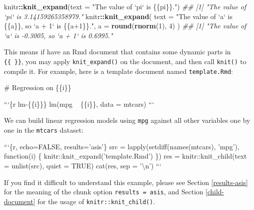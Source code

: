 \documentclass[
  11pt,
]{krantz}
\newenvironment{Shaded}{\begin{snugshade}}{\end{snugshade}}
\newcommand{\BaseNTok}[1]{\textcolor[rgb]{0.06,0.06,0.06}{#1}}
\newcommand{\CommentTok}[1]{\textcolor[rgb]{0.37,0.37,0.37}{\textit{#1}}}
\newcommand{\DataTypeTok}[1]{\textcolor[rgb]{0.27,0.27,0.27}{#1}}
\newcommand{\DecValTok}[1]{\textcolor[rgb]{0.06,0.06,0.06}{#1}}
\newcommand{\FunctionTok}[1]{\textcolor[rgb]{0,0,0}{#1}}
\newcommand{\KeywordTok}[1]{\textcolor[rgb]{0.27,0.27,0.27}{\textbf{#1}}}
\newcommand{\NormalTok}[1]{#1}
\newcommand{\OperatorTok}[1]{\textcolor[rgb]{0.43,0.43,0.43}{\textbf{#1}}}
\newcommand{\StringTok}[1]{\textcolor[rgb]{0.5,0.5,0.5}{#1}}
\begin{document}
\begin{Shaded}
\begin{Highlighting}[]
\NormalTok{knitr}\OperatorTok{::}\KeywordTok{knit_expand}\NormalTok{(}\DataTypeTok{text =} \StringTok{"The value of `pi` is \{\{pi\}\}."}\NormalTok{)}
\CommentTok{## [1] "The value of `pi` is 3.14159265358979."}
\NormalTok{knitr}\OperatorTok{::}\KeywordTok{knit_expand}\NormalTok{(}
  \DataTypeTok{text =} \StringTok{"The value of `a` is \{\{a\}\}, so `a + 1` is \{\{a+1\}\}."}\NormalTok{,}
  \DataTypeTok{a =} \KeywordTok{round}\NormalTok{(}\KeywordTok{rnorm}\NormalTok{(}\DecValTok{1}\NormalTok{), }\DecValTok{4}\NormalTok{)}
\NormalTok{)}
\CommentTok{## [1] "The value of `a` is -0.3005, so `a + 1` is 0.6995."}
\end{Highlighting}
\end{Shaded}

This means if have an Rmd document that contains some dynamic parts in \texttt{\{\{\ \}\}}, you may apply \texttt{knit\_expand()} on the document, and then call \texttt{knit()} to compile it. For example, here is a template document named \texttt{template.Rmd}:

\begin{Shaded}
\begin{Highlighting}[]
\FunctionTok{# Regression on \{\{i\}\}}

\BaseNTok{```\{r lm-\{\{i\}\}\}}
\BaseNTok{lm(mpg ~ \{\{i\}\}, data = mtcars)}
\BaseNTok{```}
\end{Highlighting}
\end{Shaded}

We can build linear regression models using \texttt{mpg} against all other variables one by one in the \texttt{mtcars} dataset:

\begin{Shaded}
\begin{Highlighting}[]
\BaseNTok{```\{r, echo=FALSE, results='asis'\}}
\BaseNTok{src = lapply(setdiff(names(mtcars), 'mpg'), function(i) \{}
\BaseNTok{  knitr::knit_expand('template.Rmd')}
\BaseNTok{\})}
\BaseNTok{res = knitr::knit_child(text = unlist(src), quiet = TRUE)}
\BaseNTok{cat(res, sep = '\textbackslash{}n')}
\BaseNTok{```}
\end{Highlighting}
\end{Shaded}

If you find it difficult to understand this example, please see Section \ref{results-asis} for the meaning of the chunk option \texttt{results\ =\ \textquotesingle{}asis\textquotesingle{}}, and Section \ref{child-document} for the usage of \texttt{knitr::knit\_child()}.
\end{document}
